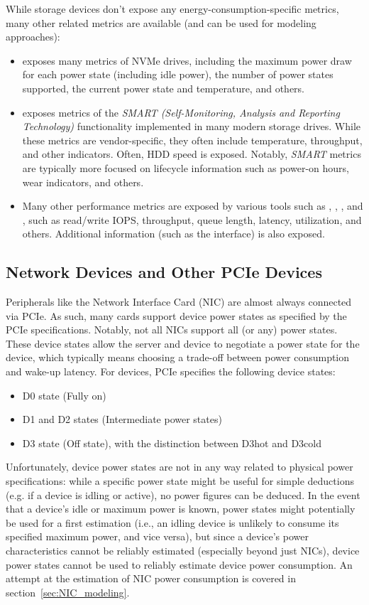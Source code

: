 While storage devices don't expose any energy-consumption-specific metrics, many other related metrics are available (and can be used for modeling approaches):
\begin{itemize}
    \item {}\parencite{nvmecli_github} exposes many metrics of NVMe drives, including the maximum power draw for each power state (including idle power), the number of power states supported, the current power state and temperature, and others.
    \item {}\parencite{smartmontools_github} exposes metrics of the \textit{SMART (Self-Monitoring, Analysis and Reporting Technology)} functionality implemented in many modern storage drives. While these metrics are vendor-specific, they often include temperature, throughput, and other indicators. Often, HDD speed is exposed. Notably, \textit{SMART} metrics are typically more focused on lifecycle information such as power-on hours, wear indicators, and others.
    \item Many other performance metrics are exposed by various tools such as , , , and , such as read/write IOPS, throughput, queue length, latency, utilization, and others. Additional information (such as the interface) is also exposed.
\end{itemize}

\subsection{Network Devices and Other PCIe Devices}

Peripherals like the Network Interface Card (NIC) are almost always connected via PCIe. As such, many cards support device power states\parencite{technotes_pci_power_2024} as specified by the PCIe specifications. Notably, not all NICs support all (or any) power states. These device states allow the server and device to negotiate a power state for the device, which typically means choosing a trade-off between power consumption and wake-up latency. For devices, PCIe specifies the following device states:
\begin{itemize}
    \item D0 state (Fully on)
    \item D1 and D2 states (Intermediate power states)
    \item D3 state (Off state), with the distinction between D3hot and D3cold
\end{itemize}
Unfortunately, device power states are not in any way related to physical power specifications: while a specific power state might be useful for simple deductions (e.g. if a device is idling or active), no power figures can be deduced. In the event that a device's idle or maximum power is known, power states might potentially be used for a first estimation (i.e., an idling device is unlikely to consume its specified maximum power, and vice versa), but since a device's power characteristics cannot be reliably estimated (especially beyond just NICs), device power states cannot be used to reliably estimate device power consumption. An attempt at the estimation of NIC power consumption is covered in section~\ref{sec:NIC_modeling}.

